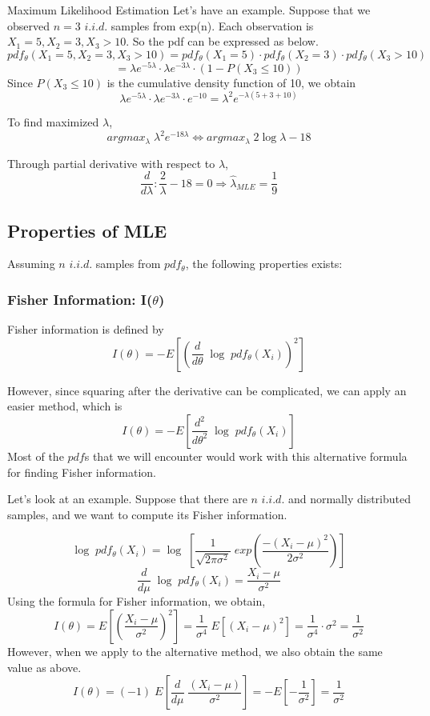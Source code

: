 \documentclass[12pt]{article}
\begin{document}
\begin{section}{Maximum Likelihood Estimation}
Let's have an example. Suppose that we observed $n=3$ $i.i.d.$ samples from exp(n). Each observation is ${X_1 = 5, X_2 = 3, X_3 > 10}$. So the pdf can be expressed as below.
$$pdf_\theta(X_1 = 5, X_2 = 3, X_3 > 10) = pdf_\theta(X_1 = 5) \cdot pdf_\theta (X_2 = 3) \cdot pdf_\theta (X_3>10)$$
$$= \lambda e^{-5\lambda} \cdot \lambda e^{-3\lambda} \cdot (1 - P(X_3 \leq 10))$$
Since $P(X_3 \leq 10)$ is the cumulative density function of 10, we obtain
$$\lambda e^{-5\lambda} \cdot \lambda e^{-3\lambda} \cdot e^{-10} = \lambda ^2 e^{-\lambda(5+3+10)}$$

To find maximized $\lambda$, 
$$argmax_\lambda \;\lambda^2 e^{-18\lambda} \Leftrightarrow argmax_\lambda \;2\log\lambda -18$$

Through partial derivative with respect to $\lambda$,
$$\frac{d}{d\lambda}: \frac{2}{\lambda} -18 = 0 \Rightarrow \hat{\lambda}_{MLE} = \frac{1}{9}$$

\subsection{Properties of MLE}
Assuming $n$ $i.i.d.$ samples from $pdf_\theta$, the following properties exists:\\ 
\subsubsection{Fisher Information: I($\theta$)}

Fisher information is defined by 
$$I(\theta) = - E\left[\left(\frac{d}{d\theta}\; \log \;pdf_\theta (X_i)\right)^2\right]$$ 

However, since squaring after the derivative can be complicated, we can apply an easier method, which is
$$I(\theta) = -E\left[\frac{d^2}{d\theta^2}\;\log\;pdf_\theta (X_i)\right]$$
Most of the $pdf$s that we will encounter would work with this alternative formula for finding Fisher information. 

Let's look at an example. Suppose that there are $n$ $i.i.d.$ and normally distributed samples, and we want to compute its Fisher information.

$$\log\; pdf_\theta (X_i) = \log\;\left[ \frac{1}{\sqrt{2\pi\sigma^2}}\;exp\left(\frac{-(X_i-\mu)^2}{2\sigma^2}\right)\right]$$
$$\frac{d}{d\mu}\;\log\;pdf_\theta(X_i) = \frac{X_i-\mu}{\sigma^2}$$
Using the formula for Fisher information, we obtain,
$$I(\theta) = E\left[(\frac{X_i-\mu}{\sigma^2})^2\right] = \frac{1}{\sigma^4}\;E[(X_i-\mu)^2] = \frac{1}{\sigma^4} \cdot \sigma^2 = \frac{1}{\sigma^2}$$
However, when we apply to the alternative method, we also obtain the same value as above.
$$I(\theta) = (-1)\;E\left[\frac{d}{d\mu}\;\frac{(X_i-\mu)}{\sigma^2}\right] = -E\left[-\frac{1}{\sigma^2}\right] = \frac{1}{\sigma^2}$$


\end{section}
\end{document}
